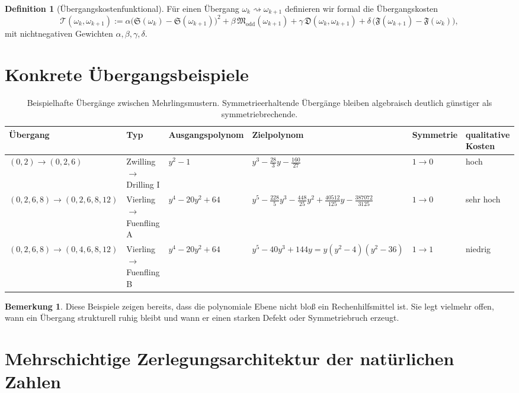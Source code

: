 \documentclass[11pt,a4paper]{article}
\theoremstyle{definition}
\newtheorem{definition}[satz]{Definition}
\newtheorem{bemerkung}[satz]{Bemerkung}
\begin{document}
\begin{definition}[Übergangskostenfunktional]
Für einen Übergang \(\omega_k\rightsquigarrow\omega_{k+1}\) definieren wir formal die Übergangskosten
\[
\mathcal T(\omega_k,\omega_{k+1})
:=
\alpha\bigl(\mathfrak S(\omega_k)-\mathfrak S(\omega_{k+1})\bigr)^2
+\beta\,\mathfrak M_{\mathrm{odd}}(\omega_{k+1})
+\gamma\,\mathfrak D(\omega_k,\omega_{k+1})
+\delta\,\bigl(\mathfrak F(\omega_{k+1})-\mathfrak F(\omega_k)\bigr),
\]
mit nichtnegativen Gewichten \(\alpha,\beta,\gamma,\delta\).
\end{definition}

\section{Konkrete Übergangsbeispiele}

\begin{table}[H]
\centering
\begin{tabular}{llllll}
\toprule
Übergang & Typ & Ausgangspolynom & Zielpolynom & Symmetrie & qualitative Kosten \\
\midrule
\((0,2)\to(0,2,6)\)
&
Zwilling \(\to\) Drilling I
&
\(\displaystyle y^2-1\)
&
\(\displaystyle y^3-\frac{28}{3}y-\frac{160}{27}\)
&
\(1\to 0\)
&
hoch
\\[0.8em]

\((0,2,6,8)\to(0,2,6,8,12)\)
&
Vierling \(\to\) Fuenfling A
&
\(\displaystyle y^4-20y^2+64\)
&
\(\displaystyle y^5-\frac{228}{5}y^3-\frac{448}{25}y^2+\frac{40512}{125}y-\frac{387072}{3125}\)
&
\(1\to 0\)
&
sehr hoch
\\[1.0em]

\((0,2,6,8)\to(0,4,6,8,12)\)
&
Vierling \(\to\) Fuenfling B
&
\(\displaystyle y^4-20y^2+64\)
&
\(\displaystyle y^5-40y^3+144y = y(y^2-4)(y^2-36)\)
&
\(1\to 1\)
&
niedrig
\\
\bottomrule
\end{tabular}
\caption{Beispielhafte Übergänge zwischen Mehrlingsmustern. Symmetrieerhaltende Übergänge bleiben algebraisch deutlich günstiger als symmetriebrechende.}
\end{table}

\begin{bemerkung}
Diese Beispiele zeigen bereits, dass die polynomiale Ebene nicht bloß ein Rechenhilfsmittel ist. Sie legt vielmehr offen, wann ein Übergang strukturell ruhig bleibt und wann er einen starken Defekt oder Symmetriebruch erzeugt.
\end{bemerkung}

\section{Mehrschichtige Zerlegungsarchitektur der natürlichen Zahlen}
\end{document}
